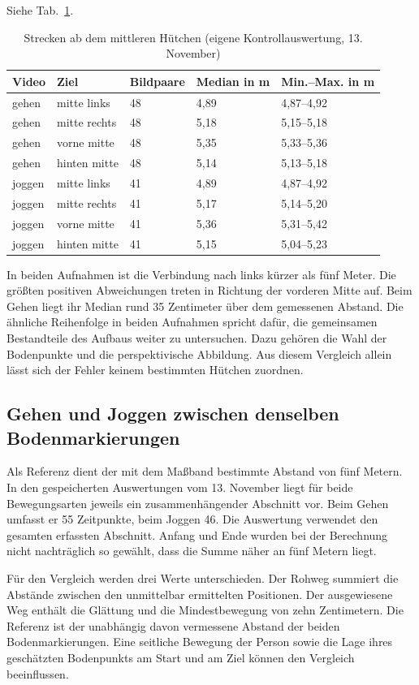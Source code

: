 Siehe Tab.~\ref{tab:em-abstaende}.
\begin{table}[htbp]\centering\caption{Strecken ab dem mittleren Hütchen (eigene Kontrollauswertung, 13. November)}\label{tab:em-abstaende}
\begin{tabular}{@{}lllll@{}}\toprule Video & Ziel & Bildpaare & Median in m & Min.–Max. in m\\\midrule
gehen & mitte links & 48 & 4,89 & 4,87–4,92\\
gehen & mitte rechts & 48 & 5,18 & 5,15–5,18\\
gehen & vorne mitte & 48 & 5,35 & 5,33–5,36\\
gehen & hinten mitte & 48 & 5,14 & 5,13–5,18\\
joggen & mitte links & 41 & 4,89 & 4,87–4,92\\
joggen & mitte rechts & 41 & 5,17 & 5,14–5,20\\
joggen & vorne mitte & 41 & 5,36 & 5,31–5,42\\
joggen & hinten mitte & 41 & 5,15 & 5,04–5,23\\\bottomrule\end{tabular}\end{table}
In beiden Aufnahmen ist die Verbindung nach links kürzer als fünf Meter. Die größten positiven Abweichungen treten in Richtung der vorderen Mitte auf. Beim Gehen liegt ihr Median rund 35 Zentimeter über dem gemessenen Abstand. Die ähnliche Reihenfolge in beiden Aufnahmen spricht dafür, die gemeinsamen Bestandteile des Aufbaus weiter zu untersuchen. Dazu gehören die Wahl der Bodenpunkte und die perspektivische Abbildung. Aus diesem Vergleich allein lässt sich der Fehler keinem bestimmten Hütchen zuordnen.

\subsection{Gehen und Joggen zwischen denselben Bodenmarkierungen}
Als Referenz dient der mit dem Maßband bestimmte Abstand von fünf Metern. In den gespeicherten Auswertungen vom 13. November liegt für beide Bewegungsarten jeweils ein zusammenhängender Abschnitt vor. Beim Gehen umfasst er 55 Zeitpunkte, beim Joggen 46. Die Auswertung verwendet den gesamten erfassten Abschnitt. Anfang und Ende wurden bei der Berechnung nicht nachträglich so gewählt, dass die Summe näher an fünf Metern liegt.

Für den Vergleich werden drei Werte unterschieden. Der Rohweg summiert die Abstände zwischen den unmittelbar ermittelten Positionen. Der ausgewiesene Weg enthält die Glättung und die Mindestbewegung von zehn Zentimetern. Die Referenz ist der unabhängig davon vermessene Abstand der beiden Bodenmarkierungen. Eine seitliche Bewegung der Person sowie die Lage ihres geschätzten Bodenpunkts am Start und am Ziel können den Vergleich beeinflussen.


